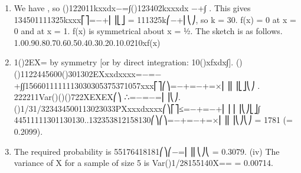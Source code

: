 \begin{enumerate}
\item We have , so ()122011kxxdx−=∫()123402kxxxdx −+∫ . This gives 134501111325kxxx⎡⎤=−+⎢⎥⎣⎦ = 111325k⎛−+⎜⎝⎠, so k = 30.
f(x) = 0 at x = 0 and at x = 1. f(x) is symmetrical about x = ½. The sketch is as follows. 1.00.90.80.70.60.50.40.30.20.10.0210xf(x)
\item 1()2EX= by symmetry [or by direct integration: 10()xfxdx∫].
()()1122445600()301302EXxxdxxxx=−=−+∫∫1566011111113030305375371057xxx⎡⎤⎛⎞=−+=−+=×⎜⎟⎢⎥⎣⎦⎝⎠ .
{}222211Var()()()722XEXEX⎛⎞ ∴=−=−=⎜⎟⎝⎠. ()1/31/323434500113023033PXxxxdxxxx⎛⎞⎡⎤≤=−+=−+⎜⎟ ⎢⎥⎝⎠⎣⎦∫ 44511111301130130..132353812158130⎛⎞⎛⎞=−+=−+=×⎜⎟⎜⎟⎝⎠⎝⎠ = 1781 (= 0.2099).
\item The required probability is 55176418181⎛⎞⎛−=⎜⎟⎜⎝⎠⎝ = 0.3079.
(iv) The variance of X for a sample of size 5 is Var()1/28155140X== = 0.00714.
\end{enumerate}
